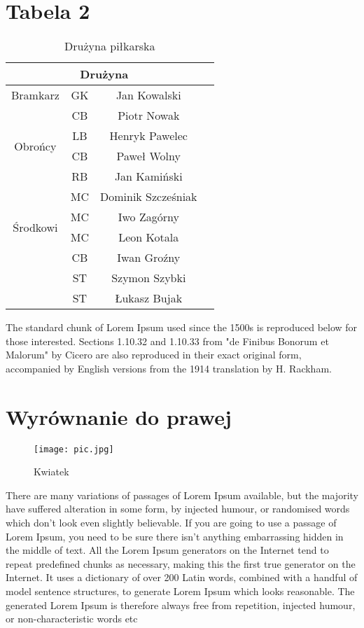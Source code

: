 \documentclass[a4paper,12pt]{article}
\begin{document}
	\section{Tabela 2}
	\begin{SCtable}[1.9][h]
		\begin{tabular}{ |c|c|c|c| } 
			\hline
			\multicolumn{3}{|c|}{Drużyna} \\
			\hline
			Bramkarz & GK & Jan Kowalski \\
			\hline
			\multirow{4}{4em}{Obrońcy} & CB & Piotr Nowak \\ 
			& LB & Henryk Pawelec \\ 
			& CB & Paweł Wolny \\ 
			& RB & Jan Kamiński \\ 
			\hline
			\multirow{4}{4em}{Środkowi} & MC  & Dominik Szcześniak \\ 
			& MC & Iwo Zagórny \\ 
			& MC & Leon Kotala \\
			\hline	
			\multirow{4}{5em}{Napastnicy} & CB & Iwan Groźny \\ 
			& ST & Szymon Szybki \\ 
			& ST & Łukasz Bujak \\ 
			\hline	
		\end{tabular}
		\caption{Drużyna piłkarska}
	\end{SCtable}
	The standard chunk of Lorem Ipsum used since the 1500s is reproduced below for those interested. Sections 1.10.32 and 1.10.33 from "de Finibus Bonorum et Malorum" by Cicero are also reproduced in their exact original form, accompanied by English versions from the 1914 translation by H. Rackham.
	
	
	\section{Wyrównanie do prawej}
	\begin{wrapfigure}{r}{0.5\textwidth}
		\texttt{[image: pic.jpg]}
		\caption{Kwiatek}
	\end{wrapfigure}
	There are many variations of passages of Lorem Ipsum available, but the majority have suffered alteration in some form, by injected humour, or randomised words which don't look even slightly believable. If you are going to use a passage of Lorem Ipsum, you need to be sure there isn't anything embarrassing hidden in the middle of text. All the Lorem Ipsum generators on the Internet tend to repeat predefined chunks as necessary, making this the first true generator on the Internet. It uses a dictionary of over 200 Latin words, combined with a handful of model sentence structures, to generate Lorem Ipsum which looks reasonable. The generated Lorem Ipsum is therefore always free from repetition, injected humour, or non-characteristic words etc
	
\end{document}
